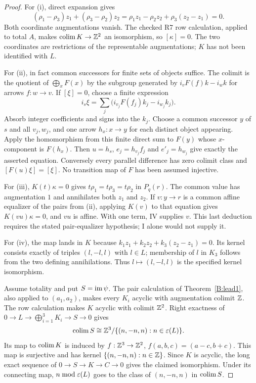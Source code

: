 \begin{proof}
For (i), direct expansion gives
\[
 (\rho_1-\rho_3)z_1+(\rho_3-\rho_2)z_2
 =\rho_1z_1-\rho_2z_2+\rho_3(z_2-z_1)=0.
\]
Both coordinate augmentations vanish. The checked R7 row calculation, applied to total $A$, makes $\operatorname*{colim} K\to\mathbb Z^2$ an isomorphism, so $[\kappa]=0$. The two coordinates are restrictions of the representable augmentations; $K$ has not been identified with $L$.

For (ii), in fact common successors for finite sets of objects suffice. The colimit is the quotient of $\bigoplus_x F(x)$ by the subgroup generated by
$i_vF(f)k-i_wk$ for arrows $f:w\to v$. If $[\xi]=0$, choose a finite expression
\[
 i_s\xi=\sum_j\bigl(i_{v_j}F(f_j)k_j-i_{w_j}k_j\bigr).
\]
Absorb integer coefficients and signs into the $k_j$. Choose a common successor $y$ of $s$ and all $v_j,w_j$, and one arrow $h_x:x\to y$ for each distinct object appearing. Apply the homomorphism from this finite direct sum to $F(y)$ whose $x$-component is $F(h_x)$. Then $u=h_s$, $e_j=h_{v_j}f_j$ and $e'_j=h_{w_j}$ give exactly the asserted equation. Conversely every parallel difference has zero colimit class and $[F(u)\xi]=[\xi]$. No transition map of $F$ has been assumed injective.

For (iii), $K(t)\kappa=0$ gives $t\rho_1=t\rho_3=t\rho_2$ in $P_q(r)$. The common value has augmentation $1$ and annihilates both $z_1$ and $z_2$. If $v:y\to r$ is a common affine equalizer of the pairs from (ii), applying $K(v)$ to that equation gives $K(vu)\kappa=0$, and $vu$ is affine. With one term, IV supplies $v$. This last deduction requires the stated pair-equalizer hypothesis; I alone would not supply it.

For (iv), the map lands in $K$ because
$k_1z_1+k_2z_2+k_3(z_2-z_1)=0$. Its kernel consists exactly of triples $(l,-l,l)$ with $l\in L$; membership of $l$ in $K_3$ follows from the two defining annihilations. Thus $l\mapsto(l,-l,l)$ is the specified kernel isomorphism.

Assume totality and put $S=\operatorname{im}\psi$. The pair calculation of Theorem~\ref{B:lead1}, also applied to $(a_1,a_2)$, makes every $K_i$ acyclic with augmentation colimit $\mathbb Z$. The row calculation makes $K$ acyclic with colimit $\mathbb Z^2$. Right exactness of $0\to L\to\bigoplus_{i=1}^3K_i\to S\to0$ gives
\[
 \operatorname*{colim} S\cong\mathbb Z^3/\{(n,-n,n):n\in\varepsilon(L)\}.
\]
Its map to $\operatorname*{colim} K$ is induced by
$f:\mathbb Z^3\to\mathbb Z^2$, $f(a,b,c)=(a-c,b+c)$.
This map is surjective and has kernel $\{(n,-n,n):n\in\mathbb Z\}$. Since $K$ is acyclic, the long exact sequence of $0\to S\to K\to C\to0$ gives the claimed isomorphism. Under its connecting map, $n\bmod\varepsilon(L)$ goes to the class of $(n,-n,n)$ in $\operatorname*{colim} S$.


\end{proof}

